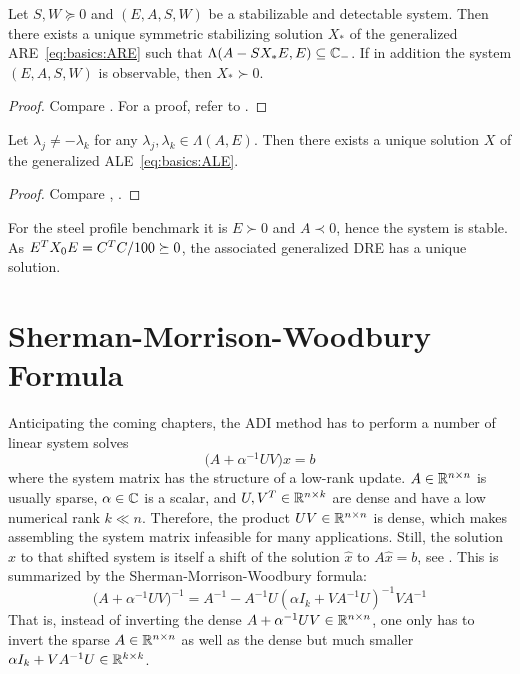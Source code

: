 \begin{theorem}
  Let $S, W \succeq 0$ and $(E, A, S, W)$ be a stabilizable and detectable system.
  Then there exists a unique symmetric stabilizing solution $X_*$ of the generalized \ac{ARE}~\eqref{eq:basics:ARE}
  such that $\Lambda(A - SX_*E, E) \subseteq \mathbb{C}_-$.
  If in addition the system $(E, A, S, W)$ is observable, then $X_* \succ 0$.
\end{theorem}
\begin{proof}
  Compare \cite[Theorem~2.9]{Lang2017}.
  For a proof, refer to \cite{Lancaster1995}.
\end{proof}

\begin{theorem}
  Let $\lambda_j \neq -\lambda_k$ for any $\lambda_j, \lambda_k \in\Lambda(A, E)$.
  Then there exists a unique solution $X$ of the generalized \ac{ALE}~\eqref{eq:basics:ALE}.
\end{theorem}
\begin{proof}
  Compare \cite[Theorem~2.10]{Lang2017}, \cite[Corollary~1.1.4]{Abou2003}.
\end{proof}

\begin{example}
  For the steel profile benchmark \cite{morwiki_steel} it is
  $E \succ 0$ and $A \prec 0$, hence the system is stable.
  As $E^T X_0 E = C^T C / 100 \succeq 0$,
  the associated generalized \ac{DRE} has a unique solution.
\end{example}

\section{Sherman-Morrison-Woodbury Formula}
\label{sec:basics:smw}

Anticipating the coming chapters,
the \ac{ADI} method has to perform a number of linear system solves
\begin{equation}
  \big(A + \alpha^{-1} UV \big) x = b
\end{equation}
where the system matrix has the structure of a low-rank update.
$A\in\mathbb{R}^{n\times n}$ is usually sparse,
$\alpha\in\mathbb{C}$ is a scalar,
and $U, V^T \in\mathbb{R}^{n\times k}$ are dense and have a low numerical rank $k\ll n$.
Therefore, the product $UV \in\mathbb{R}^{n\times n}$ is dense,
which makes assembling the system matrix infeasible for many applications.
Still, the solution $x$ to that shifted system is itself a shift of the solution $\hat x$ to $A\hat x = b$,
see \eg \cite{Strang2016, Golub2013}.
This is summarized by the Sherman-Morrison-Woodbury formula:
\begin{equation}
  \big( A + \alpha^{-1}UV \big)^{-1} =
  A^{-1} - A^{-1} U (\alpha I_k + V A^{-1} U)^{-1} V A^{-1}
\end{equation}
That is, instead of inverting the dense $A + \alpha^{-1} UV \in\mathbb{R}^{n\times n}$,
one only has to invert the sparse $A \in \mathbb{R}^{n\times n}$ as well as the dense but much smaller $\alpha I_k + VA^{-1} U \in\mathbb{R}^{k\times k}$.

